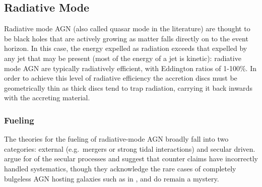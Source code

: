 	\subsection{Radiative Mode}
		\label{subsec:Radiative}
		Radiative mode AGN (also called quasar mode in the literature) are thought to be black holes that are actively growing as matter falls directly on to the event horizon. In this case, the energy expelled as radiation exceeds that expelled by any jet that may be present (most of the energy of a jet is kinetic): radiative mode AGN are typically radiatively efficient, with Eddington ratios of 1-100\%. In order to achieve this level of radiative efficiency the accretion discs must be geometrically thin as thick discs tend to trap radiation, carrying it back inwards with the accreting material. 

		\subsubsection{Fueling}
			\label{subsubsec:RadiativeFueling}
			The theories for the fueling of radiative-mode AGN broadly fall into two categories: external (e.g.\ mergers or strong tidal interactions) and secular driven. \citet{Heckman2014} argue for of the secular processes and suggest that counter claims have incorrectly handled systematics, though they acknowledge the rare cases of completely bulgeless AGN hosting galaxies such as in \citet{Filippenko1993}, \citet{Satyapal2009} and \citet{Simmons2013} do remain a mystery. 

